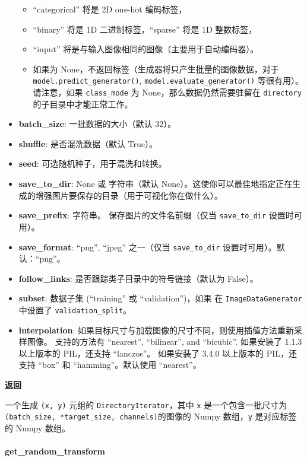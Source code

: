 \begin{itemize}
  \begin{itemize}
  \tightlist
  \item
    ``categorical'' 将是 2D one-hot 编码标签，
  \item
    ``binary'' 将是 1D 二进制标签，``sparse'' 将是 1D 整数标签，
  \item
    ``input'' 将是与输入图像相同的图像（主要用于自动编码器）。
  \item
    如果为 None，不返回标签（生成器将只产生批量的图像数据，对于
    \texttt{model.predict\_generator()},
    \texttt{model.evaluate\_generator()} 等很有用）。请注意，如果
    \texttt{class\_mode} 为 None，那么数据仍然需要驻留在
    \texttt{directory} 的子目录中才能正常工作。
  \end{itemize}
\item
  \textbf{batch\_size}: 一批数据的大小（默认 32）。
\item
  \textbf{shuffle}: 是否混洗数据（默认 True）。
\item
  \textbf{seed}: 可选随机种子，用于混洗和转换。
\item
  \textbf{save\_to\_dir}: None 或 字符串（默认
  None）。这使你可以最佳地指定正在生成的增强图片要保存的目录（用于可视化你在做什么）。
\item
  \textbf{save\_prefix}: 字符串。 保存图片的文件名前缀（仅当
  \texttt{save\_to\_dir} 设置时可用）。
\item
  \textbf{save\_format}: ``png'', ``jpeg'' 之一（仅当
  \texttt{save\_to\_dir} 设置时可用）。默认：``png''。
\item
  \textbf{follow\_links}: 是否跟踪类子目录中的符号链接（默认为 False）。
\item
  \textbf{subset}: 数据子集 (``training'' 或 ``validation'')，如果 在
  \texttt{ImageDataGenerator} 中设置了 \texttt{validation\_split}。
\item
  \textbf{interpolation}:
  如果目标尺寸与加载图像的尺寸不同，则使用插值方法重新采样图像。
  支持的方法有 ``nearest'', ``bilinear'', and ``bicubic''. 如果安装了
  1.1.3 以上版本的 PIL，还支持 ``lanczos''。 如果安装了 3.4.0 以上版本的
  PIL，还支持 ``box'' 和 ``hamming''。默认使用 ``nearest''。
\end{itemize}

\textbf{返回}

一个生成 \texttt{(x,\ y)} 元组的 \texttt{DirectoryIterator}，其中
\texttt{x} 是一个包含一批尺寸为
\texttt{(batch\_size,\ *target\_size,\ channels)}的图像的 Numpy
数组，\texttt{y} 是对应标签的 Numpy 数组。


\hypertarget{get_random_transform}{%
\paragraph{get\_random\_transform}\label{get_random_transform}}

